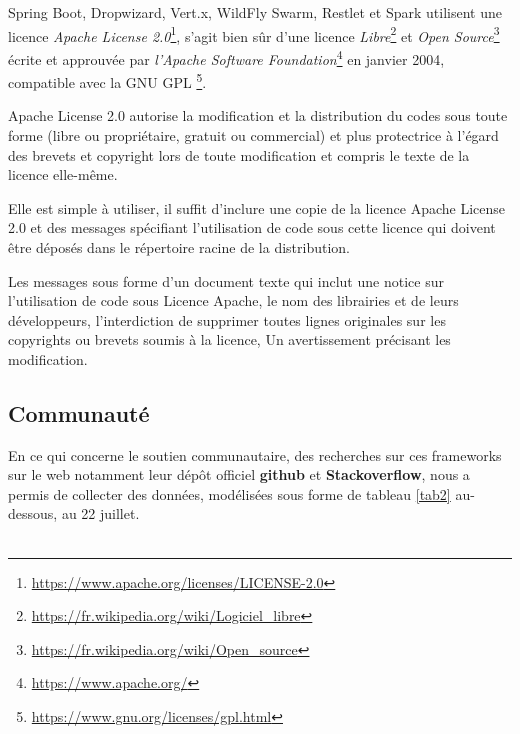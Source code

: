 \documentclass[12pt, a4paper, openany]{report}
\begin{document}
   Spring Boot, Dropwizard, Vert.x, WildFly Swarm, Restlet et Spark utilisent une licence \textit{Apache License 2.0}\footnote{\url{https://www.apache.org/licenses/LICENSE-2.0}}, s'agit bien sûr d'une licence \textit{Libre}\footnote{\url{https://fr.wikipedia.org/wiki/Logiciel_libre}} et \textit{Open Source}\footnote{\url{https://fr.wikipedia.org/wiki/Open_source}} écrite et approuvée par \textit{l'Apache Software Foundation}\footnote{\url{https://www.apache.org/}} en janvier 2004, compatible avec la GNU GPL \footnote{\url{https://www.gnu.org/licenses/gpl.html}}.
   
   Apache License 2.0 autorise la modification et la distribution du codes sous toute forme (libre ou propriétaire, gratuit ou commercial) et plus protectrice à l’égard des brevets et copyright lors de toute modification et compris le texte de la licence elle-même.
   
   Elle est simple à utiliser, il suffit d’inclure une copie de la licence Apache License 2.0 et des messages spécifiant l’utilisation de code sous cette licence qui doivent être déposés dans le répertoire racine de la distribution.
   
   Les messages sous forme d'un document texte qui inclut une notice sur l'utilisation de code sous Licence Apache, le nom des librairies et de leurs développeurs, l'interdiction de supprimer toutes lignes originales sur les copyrights ou brevets soumis à la licence, Un avertissement précisant les modification.
   
   
  
  \subsection{Communauté}
   
     En ce qui concerne le soutien communautaire, des recherches sur ces frameworks sur le web notamment leur dépôt officiel \textbf{github} et \textbf{Stackoverflow}, nous a permis de collecter des données, modélisées sous forme de tableau \ref{tab2} au-dessous, au 22 juillet. \\  \\
   
\end{document}
